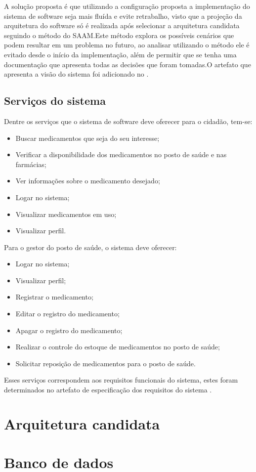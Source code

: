 %

A solução proposta é que utilizando a configuração proposta a implementação do sistema de software seja mais fluída e evite retrabalho, visto que a projeção da arquitetura do software só é realizada após selecionar a arquitetura candidata seguindo o método do \acrfull{SAAM}.Este método explora os possíveis cenários que podem resultar em um problema no futuro, ao analisar utilizando o método ele é evitado desde o início da implementação, além de permitir que se tenha uma documentação que apresenta todas as decisões que foram tomadas.O artefato que apresenta a visão do sistema foi adicionado no .

\subsection{Serviços do sistema}
 Dentre os serviços que o sistema de software deve oferecer para o cidadão, tem-se:
 
 \begin{itemize}
     \item Buscar medicamentos que seja do seu interesse;
     \item Verificar a disponibilidade dos medicamentos no posto de saúde  e nas farmácias;
     \item Ver informações sobre o medicamento desejado;
     \item Logar no sistema;
     \item Visualizar medicamentos em uso;
     \item Visualizar perfil.
    \end{itemize}
 
 Para o gestor do posto de saúde, o sistema deve oferecer:
 
 \begin{itemize}
     \item Logar no sistema;
     \item Visualizar perfil;
     \item Registrar o medicamento;
     \item Editar o registro do medicamento;
     \item Apagar o registro do medicamento;
     \item Realizar o controle do estoque de medicamentos no posto de saúde;
     \item Solicitar reposição de medicamentos para o posto de saúde.
 \end{itemize}
 
 Esses serviços correspondem aos requisitos funcionais do sistema, estes foram determinados no artefato de especificação dos requisitos do sistema .

\section{Arquitetura candidata}
\section{Banco de dados}